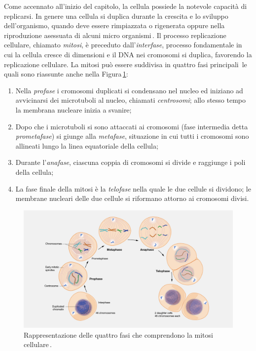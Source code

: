 Come accennato all'inizio del capitolo, la cellula possiede la notevole capacità di replicarsi. In genere una cellula si duplica durante la crescita e lo sviluppo dell'organismo, quando deve essere rimpiazzata o rigenerata oppure nella riproduzione asessuata di alcuni micro organismi\,\cite{bavle2014mitosis}. Il processo replicazione cellulare, chiamato \textsl{mitosi}, è preceduto dall'\textsl{interfase}, processo fondamentale in cui la cellula cresce di dimensioni e il \acs{DNA} nei cromosomi si duplica, favorendo la replicazione cellulare. La mitosi può essere suddivisa in quattro fasi principali\,\cite{walczak2010mechanisms, bavle2014mitosis, li2020theoretical, sullivan2007finishing} le quali sono riassunte anche nella Figura\,\ref{fig:mitosis}:
\begin{enumerate}
    \item Nella \textsl{profase} i cromosomi duplicati si condensano nel nucleo ed iniziano ad avvicinarsi dei microtuboli al nucleo, chiamati \textsl{centrosomi}; allo stesso tempo la membrana nucleare inizia a svanire;
    \item Dopo che i microtuboli si sono attaccati ai cromosomi (fase intermedia detta \textsl{prometafase}) si giunge alla \textsl{metafase}, situazione in cui tutti i cromosomi sono allineati lungo la linea equatoriale della cellula;
    \item Durante l'\textsl{anafase}, ciascuna coppia di cromosomi si divide e raggiunge i poli della cellula;
    \item La fase finale della mitosi è la \textsl{telofase} nella quale le due cellule si dividono; le membrane nucleari delle due cellule si riformano attorno ai cromosomi divisi.
\end{enumerate}

\begin{figure}[b!]
    \centering
    \includegraphics[width=\textwidth]{assets/imgs/mitosis.jpg}
    \caption[La mitosi cellulare.]{Rappresentazione delle quattro fasi che comprendono la mitosi cellulare\,\cite{nhgri_mitosis_image}.}\label{fig:mitosis}
\end{figure}

